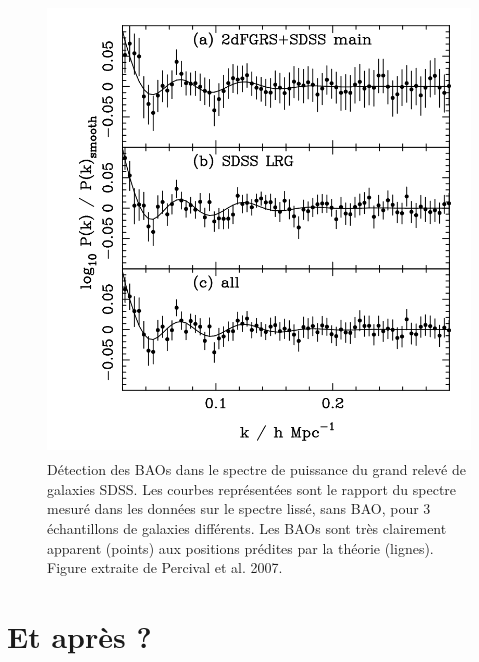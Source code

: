 \begin{figure}[htbp]
	\centering
		\includegraphics[height=12cm]{figs/percival.png}
		\caption[Les BAOs dans les relevés de galaxies]{Détection des BAOs dans le spectre de puissance du grand relevé de galaxies SDSS. Les courbes représentées sont le rapport du spectre mesuré dans les données sur le spectre lissé, sans BAO, pour 3 échantillons de galaxies différents. Les BAOs sont très clairement apparent (points) aux positions prédites par la théorie (lignes). Figure extraite de Percival et al. 2007.}
	\label{f:percival}
\end{figure}
\section{Et après ?}


